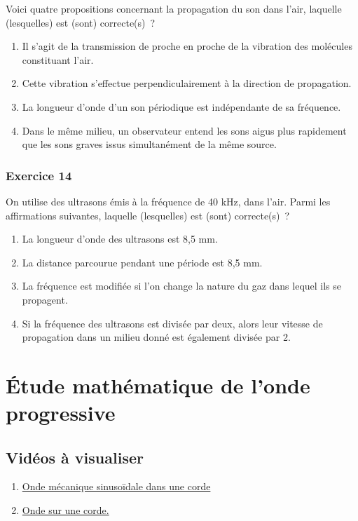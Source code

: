 \begin{multicols}{2}
Voici quatre propositions concernant la propagation du son
  dans l'air, laquelle (lesquelles) est (sont) correcte(s)~?

\begin{enumerate}
\item  Il s'agit de la transmission de proche en proche de la vibration des
  molécules constituant l'air.
\item  Cette vibration s'effectue perpendiculairement à la direction de
  propagation.
\item  La longueur d'onde d'un son périodique est indépendante de sa
  fréquence.
\item  Dans le même milieu, un observateur entend les sons aigus plus
  rapidement que les sons graves issus simultanément de la même source.
\end{enumerate}

\subsubsection*{Exercice 14}

On utilise des ultrasons émis à la fréquence de 40 \si{kHz}, dans
  l'air. Parmi les affirmations suivantes, laquelle (lesquelles) est
  (sont) correcte(s)~?
\begin{enumerate}
\item  La longueur d'onde des ultrasons est 8,5 \si{mm}.
\item
  La distance parcourue pendant une période est 8,5 \si{mm}.
\item  La fréquence est modifiée si l'on change la nature du gaz dans lequel
  ils se propagent.
\item  Si la fréquence des ultrasons est divisée par deux, alors leur vitesse
  de propagation dans un milieu donné est également divisée par 2.
\end{enumerate}


\section{Étude mathématique de l'onde progressive}

\subsection{Vidéos à visualiser}
\begin{enumerate}
 \item \href{https://youtu.be/9Hs9jeuDzwg}{Onde mécanique sinusoïdale dans une corde }
 \item \href{https://youtu.be/N654RoNHalc}{Onde sur une corde.}
\end{enumerate}


\end{multicols}
